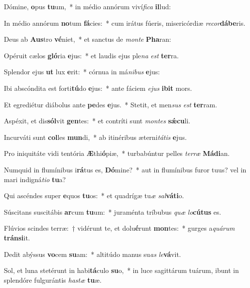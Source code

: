 \item Dómine, \textbf{o}pus \textbf{tu}um,~* in médio annórum viví\textit{fi}\textit{ca} \textbf{il}lud:
\item In médio annórum \textbf{no}tum \textbf{fá}cies:~* cum irátus fúeris, misericórdiæ \textit{re}\textit{cor}\textbf{dá}\textbf{be}ris.
\item Deus ab \textbf{Aus}tro \textbf{vé}niet,~* et sanctus de \textit{mon}\textit{te} \textbf{Pha}ran:
\item Opéruit cælos \textbf{gló}ria \textbf{e}jus:~* et laudis ejus ple\textit{na} \textit{est} \textbf{ter}ra.
\item Splendor ejus \textbf{ut} lux \textbf{e}rit:~* córnua in má\textit{ni}\textit{bus} \textbf{e}jus:
\item Ibi abscóndita est forti\textbf{tú}do \textbf{e}jus:~* ante fáciem \textit{e}\textit{jus} \textbf{i}\textbf{bit} mors.
\item Et egrediétur diábolus ante \textbf{pe}des \textbf{e}jus.~* Stetit, et men\textit{sus} \textit{est} \textbf{ter}ram.
\item Aspéxit, et dis\textbf{sól}vit \textbf{gen}tes:~* et contríti sunt \textit{mon}\textit{tes} \textbf{sǽ}\textbf{cu}li.
\item Incurváti sunt \textbf{col}les \textbf{mun}di,~* ab itinéribus æterni\textit{tá}\textit{tis} \textbf{e}jus.
\item Pro iniquitáte vidi tentória \textbf{Æ}thi\textbf{ó}piæ,~* turbabúntur pelles \textit{ter}\textit{ræ} \textbf{Má}\textbf{di}an.
\item Numquid in flumínibus i\textbf{rá}tus es, \textbf{Dó}mine?~* aut in flumínibus furor tuus? vel in mari indigná\textit{ti}\textit{o} \textbf{tu}a?
\item Qui ascéndes super \textbf{e}quos \textbf{tu}os:~* et quadrígæ tu\textit{æ} \textit{sal}\textbf{vá}\textbf{ti}o.
\item Súscitans suscitábis \textbf{ar}cum \textbf{tu}um:~* juraménta tríbubus \textit{quæ} \textit{lo}\textbf{cú}\textbf{tus} es.
\item Flúvios scindes terræ:~† vidérunt te, et dolu\textbf{é}runt \textbf{mon}tes:~* gurges a\textit{quá}\textit{rum} \textbf{tráns}\textbf{i}it.
\item Dedit abýssus \textbf{vo}cem \textbf{su}am:~* altitúdo manus su\textit{as} \textit{le}\textbf{vá}vit.
\item Sol, et luna stetérunt in habi\textbf{tá}culo \textbf{su}o,~* in luce sagittárum tuárum, ibunt in splendóre fulgurántis \textit{has}\textit{tæ} \textbf{tu}æ.

